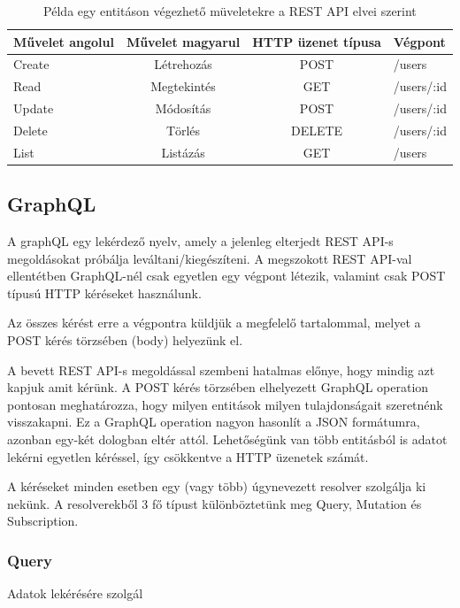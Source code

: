 \begin{table}[ht]
	\footnotesize
	\centering
	\begin{tabular}{ l c c l }
		\toprule
		Művelet angolul & Művelet magyarul & HTTP üzenet típusa & Végpont \\
		\midrule
		Create & Létrehozás & POST & /users \\
		Read & Megtekintés & GET & /users/:id \\
		Update & Módosítás  & POST & /users/:id \\
		Delete & Törlés  &  DELETE & /users/:id \\
		List & Listázás  & GET & /users \\
		\bottomrule
	\end{tabular}
	\caption{Példa egy entitáson végezhető müveletekre a REST API elvei szerint}
	\label{tab:RESTTable}
\end{table}


\subsection{GraphQL}

A graphQL egy lekérdező nyelv, amely a jelenleg elterjedt REST API-s megoldásokat próbálja leváltani/kiegészíteni. A megszokott REST API-val ellentétben GraphQL-nél csak egyetlen egy végpont létezik, valamint csak POST típusú HTTP kéréseket használunk. 

Az összes kérést erre a végpontra küldjük a megfelelő tartalommal, melyet a POST kérés törzsében (body) helyezünk el.

A bevett REST API-s megoldással szembeni hatalmas előnye, hogy mindig azt kapjuk amit kérünk. A POST kérés törzsében elhelyezett GraphQL operation pontosan meghatározza, hogy milyen entitások milyen tulajdonságait szeretnénk visszakapni. Ez a GraphQL operation nagyon hasonlít a JSON formátumra, azonban egy-két dologban eltér attól. Lehetőségünk van több entitásból is adatot lekérni egyetlen kéréssel, így csökkentve a HTTP üzenetek számát.

A kéréseket minden esetben egy (vagy több) úgynevezett resolver szolgálja ki nekünk. 
A resolverekből 3 fő típust különböztetünk meg Query, Mutation és Subscription.

\subsubsection{Query}
Adatok lekérésére szolgál
  
